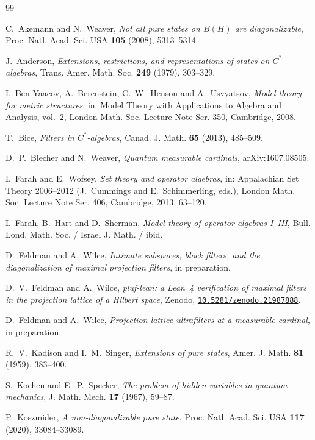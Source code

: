 \documentclass[11pt,reqno]{amsart}
\theoremstyle{definition}
\begin{document}
\begin{thebibliography}{99}

 C.~Akemann and N.~Weaver, \emph{Not all pure states on $B(H)$ are
diagonalizable}, Proc. Natl. Acad. Sci. USA \textbf{105} (2008), 5313--5314.

 J.~Anderson, \emph{Extensions, restrictions, and representations of
states on $C^*$-algebras}, Trans. Amer. Math. Soc. \textbf{249} (1979), 303--329.

 I.~Ben Yaacov, A.~Berenstein, C.~W.~Henson and A.~Usvyatsov, \emph{Model
theory for metric structures}, in: Model Theory with Applications to Algebra and
Analysis, vol.~2, London Math. Soc. Lecture Note Ser. 350, Cambridge, 2008.

 T.~Bice, \emph{Filters in $C^*$-algebras}, Canad. J. Math. \textbf{65}
(2013), 485--509.

 D.~P.~Blecher and N.~Weaver, \emph{Quantum measurable cardinals},
arXiv:1607.08505.

 I.~Farah and E.~Wofsey, \emph{Set theory and operator algebras},
in: Appalachian Set Theory 2006--2012 (J.~Cummings and E.~Schimmerling, eds.), London
Math. Soc. Lecture Note Ser. 406, Cambridge, 2013, 63--120.

 I.~Farah, B.~Hart and D.~Sherman, \emph{Model theory of operator algebras
I--III}, Bull. Lond. Math. Soc. / Israel J. Math. / ibid.

 D.~Feldman and A.~Wilce, \emph{Intimate subspaces, block filters, and the
diagonalization of maximal projection filters}, in preparation.

 D.~V.~Feldman and A.~Wilce, \emph{pluf-lean: a Lean~4 verification of maximal filters in the projection lattice of a Hilbert space}, Zenodo, \href{https://doi.org/10.5281/zenodo.21987888}{\texttt{10.5281/zenodo.21987888}}.

 D.~Feldman and A.~Wilce, \emph{Projection-lattice ultrafilters at a
measurable cardinal}, in preparation.

 R.~V.~Kadison and I.~M.~Singer, \emph{Extensions of pure states},
Amer. J. Math. \textbf{81} (1959), 383--400.

 S.~Kochen and E.~P.~Specker, \emph{The problem of hidden variables in
quantum mechanics}, J. Math. Mech. \textbf{17} (1967), 59--87.

 P.~Koszmider, \emph{A non-diagonalizable pure state}, Proc. Natl.
Acad. Sci. USA \textbf{117} (2020), 33084--33089.


\end{thebibliography}
\end{document}
